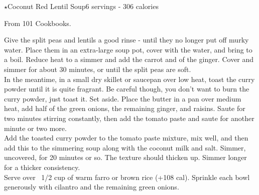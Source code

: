 \begin{recipe}{$\star$Coconut Red Lentil Soup}{6 servings - 306 calories}{}

\freeform From 101 Cookbooks.


Give the split peas and lentils a good rinse - until they no longer put off murky water. Place them in an extra-large soup pot, cover with the water, and bring to a boil. Reduce heat to a simmer and add the carrot and  of the ginger. Cover and simmer for about 30 minutes, or until the split peas are soft.\\

In the meantime, in a small dry skillet or saucepan over low heat, toast the curry powder until it is quite fragrant. Be careful though, you don't want to burn the curry powder, just toast it. Set aside. Place the butter in a pan over medium heat, add half of the green onions, the remaining ginger, and raisins. Saute for two minutes stirring constantly, then add the tomato paste and saute for another minute or two more.\\

Add the toasted curry powder to the tomato paste mixture, mix well, and then add this to the simmering soup along with the coconut milk and salt. Simmer, uncovered, for 20 minutes or so. The texture should thicken up. Simmer longer for a thicker consistency.\\

Serve over ~1/2 cup of warm farro or brown rice (+108 cal). Sprinkle each bowl generously with cilantro and the remaining green onions.

\end{recipe}